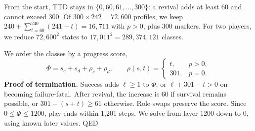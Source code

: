 \documentclass[10pt]{article}
\newcommand{\head}[1]{\par\vspace{5pt}{\large\bfseries #1}\par\vspace{2pt}}
\begin{document}
\begin{minipage}[t]{0.505\textwidth}
From the start, TTD stays in $\{0,60,61,\ldots,300\}$:
a revival adds at least 60 and cannot exceed 300.
Of $300\times242=72{,}600$ profiles, we keep
$240+\sum_{t=60}^{240}(241-t)=16{,}711$ with $p>0$, plus 300 markers.
For two players, we reduce $72{,}600^2$ states to
$17{,}011^2=289{,}374{,}121$ classes.

\head{3. Solve later states first}
We order the classes by a progress score,
\[
\Phi=s_c+s_d+\rho_c+\rho_d,\qquad
\rho(s,t)=\begin{cases}t,&p>0,\\301,&p=0.\end{cases}
\]
\textbf{Proof of termination.} Success adds $\ell\ge1$ to
$\Phi$, or $\ell+301-t>0$ on becoming failure-fatal.
After revival, the increase is 60 if survival remains possible,
or $301-(s+t)\ge61$ otherwise. Role swaps preserve the score.
Since $0\le\Phi\le1200$, play ends within 1,201 steps.
We solve from layer 1200 down to 0, using known later values. \textup{QED}

\end{minipage}\hfill
\end{document}
